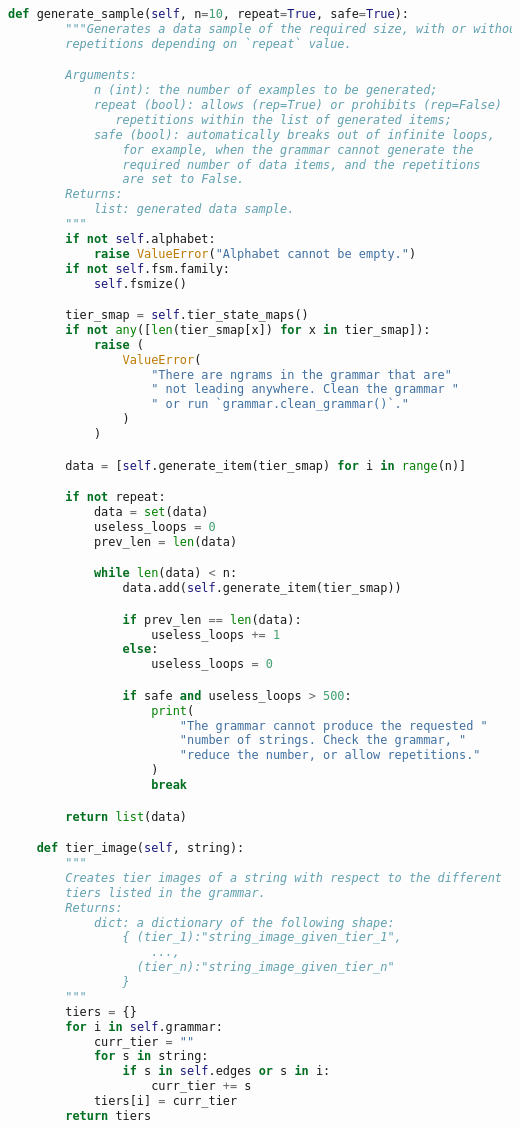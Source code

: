 \begin{lstlisting}[language=Python]
    def generate_sample(self, n=10, repeat=True, safe=True):
        """Generates a data sample of the required size, with or without
        repetitions depending on `repeat` value.

        Arguments:
            n (int): the number of examples to be generated;
            repeat (bool): allows (rep=True) or prohibits (rep=False)
               repetitions within the list of generated items;
            safe (bool): automatically breaks out of infinite loops,
                for example, when the grammar cannot generate the
                required number of data items, and the repetitions
                are set to False.
        Returns:
            list: generated data sample.
        """
        if not self.alphabet:
            raise ValueError("Alphabet cannot be empty.")
        if not self.fsm.family:
            self.fsmize()

        tier_smap = self.tier_state_maps()
        if not any([len(tier_smap[x]) for x in tier_smap]):
            raise (
                ValueError(
                    "There are ngrams in the grammar that are"
                    " not leading anywhere. Clean the grammar "
                    " or run `grammar.clean_grammar()`."
                )
            )

        data = [self.generate_item(tier_smap) for i in range(n)]

        if not repeat:
            data = set(data)
            useless_loops = 0
            prev_len = len(data)

            while len(data) < n:
                data.add(self.generate_item(tier_smap))

                if prev_len == len(data):
                    useless_loops += 1
                else:
                    useless_loops = 0

                if safe and useless_loops > 500:
                    print(
                        "The grammar cannot produce the requested "
                        "number of strings. Check the grammar, "
                        "reduce the number, or allow repetitions."
                    )
                    break

        return list(data)

    def tier_image(self, string):
        """
        Creates tier images of a string with respect to the different
        tiers listed in the grammar.
        Returns:
            dict: a dictionary of the following shape:
                { (tier_1):"string_image_given_tier_1",
                    ...,
                  (tier_n):"string_image_given_tier_n"
                }
        """
        tiers = {}
        for i in self.grammar:
            curr_tier = ""
            for s in string:
                if s in self.edges or s in i:
                    curr_tier += s
            tiers[i] = curr_tier
        return tiers


\end{lstlisting}
